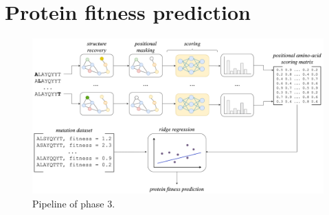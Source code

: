 \section{Protein fitness prediction}
\begin{figure}
    \centering
    \includegraphics[width=\textwidth]{masters-report/figures/protein_fitness_prediction.png}
    \caption{Pipeline of phase 3.}
    \label{fitness-prediction}
\end{figure}

